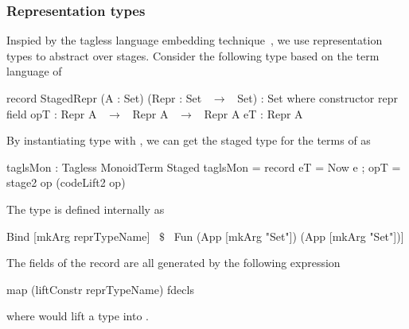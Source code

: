 \begin{comment}
Constants and variable are staged with The automatic annotation is done by Lifting constants from term language to staged term language is done by adding the \lstmath{Now} constructor of the \lstmath{Staged} before the constant symbol 
\begin{hscode} 
liftConstant :: Constr -> (Pattern,Expr) 
liftConstant c = (mkPattern c, App [mkArg "Now",Arg ~$\$$~ fappExpr c])
\end{hscode} 
In a similar way, a variable of the form \lstmath{v x} is lifted to the \lstmath{Staged} expression \\
\lstmath{(Later (Computation Const x))}.
\end{comment}

\subsubsection{Representation types}
\label{sec:generation:tagless}
Inspied by the tagless language embedding technique~\cite{carette2009finally}, we use representation types to abstract over stages. Consider the following type based on the term language of  
\begin{togcode}
record StagedRepr (A : Set) (Repr : Set ~$\to$~ Set) : Set where
 constructor repr
 field
   opT : Repr A ~$\to$~ Repr A ~$\to$~ Repr A
   eT  : Repr A
\end{togcode}
By instantiating  type with , we can get the staged type for the terms of  as 
\begin{togcode}
taglsMon : Tagless MonoidTerm Staged 
taglsMon = record {eT = Now e ; opT = stage2 op (codeLift2 op)}
\end{togcode}

The type  is defined internally as 
\begin{hscode} 
Bind [mkArg reprTypeName] ~$\$$~ Fun (App [mkArg "Set"]) (App [mkArg "Set"])]
\end{hscode} 
The fields of the record are all generated by the following expression 
\begin{hscode} 
map (liftConstr reprTypeName) fdecls
\end{hscode} 
where  would lift a type  into . 


